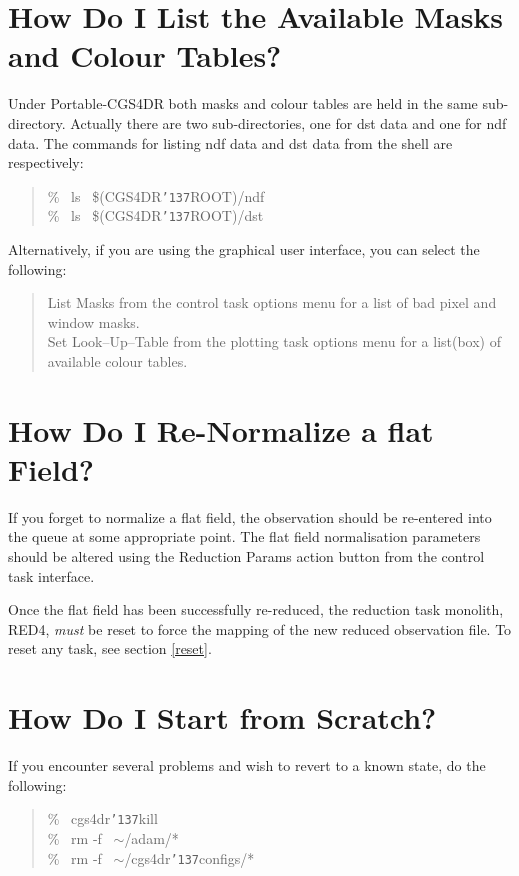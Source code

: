\documentclass[a4paper]{book}
\renewcommand{\_}{{\tt\char'137}}
\begin{document}
\section{How Do I List the Available Masks and Colour Tables?}
Under Portable-CGS4DR both masks and colour tables are held in the same sub-directory.
Actually there are two sub-directories, one for {\sc dst} data and one for {\sc ndf} data.
The commands for listing {\sc ndf} data and {\sc dst} data from the shell are respectively:

\begin{quote}
 \% \ ls \ \$(CGS4DR\_ROOT)/ndf \\
 \% \ ls \ \$(CGS4DR\_ROOT)/dst
\end{quote}

Alternatively, if you are using the graphical user interface, you can select the following:

\begin{quote}
 {\sf List Masks} from the control task options menu for a list of bad pixel and window masks.\\
 {\sf Set Look--Up--Table} from the plotting task options menu for a list(box) of available colour tables.
\end{quote}

\section{How Do I Re-Normalize a {\sc flat} Field?}
If you forget to normalize a {\sc flat} field, the observation should be re-entered into the
queue at some appropriate point. The {\sc flat} field normalisation parameters should be
altered using the {\sf Reduction Params} action button from the control task interface.

Once the {\sc flat} field has been successfully re-reduced, the reduction task monolith,
RED4, {\em must} be reset to force the mapping of the new reduced observation file. To reset
any task, see section \ref{reset}.

\section{How Do I Start from Scratch?}
\label{restart}
If you encounter several problems and wish to revert to a known state, do the following:

\begin{quote}
  \% \ cgs4dr\_kill \\
  \% \ rm -f \ $\sim$/adam/* \\
  \% \ rm -f \ $\sim$/cgs4dr\_configs/*
\end{quote}
\end{document}
